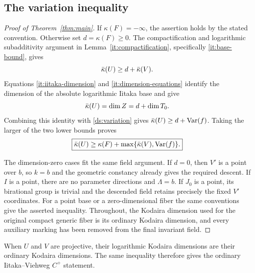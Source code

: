 \subsection{The variation inequality}

\begin{proof}[Proof of Theorem~\ref{thm:main}]
If $\kappa(F)=-\infty$,
the assertion holds by the stated convention.  Otherwise set
$d=\kappa(F)\geq0$.  The compactification and logarithmic
subadditivity argument in Lemma~\ref{it:compactification},
specifically \eqref{it:base-bound}, gives
\[
 \bar\kappa(U)\geq d+\bar\kappa(V).
\]
Equations \eqref{it:iitaka-dimension} and
\eqref{it:dimension-equations} identify the dimension of the
absolute logarithmic Iitaka base and give
\[
 \bar\kappa(U)=\dim Z=d+\dim T_0.
\]
Combining this identity with \eqref{ds:variation} gives
$\bar\kappa(U)\geq d+\operatorname{Var}(f)$.  Taking the larger of the two lower
bounds proves
\[
 \boxed{\displaystyle
 \bar\kappa(U)\geq\kappa(F)
                  +\max\{\bar\kappa(V),\operatorname{Var}(f)\}.}
\]

The dimension-zero cases fit the same field argument.  If $d=0$,
then $V'$ is a point over $b$, so $k=b$ and the geometric
constancy already gives the required descent.  If $I$ is a
point, there are no parameter directions and $\Lambda=b$.
If $J_0$ is a point, its birational group is trivial and the
descended field retains precisely the fixed $V'$ coordinates.
For a point base or a zero-dimensional fiber the same conventions
give the asserted inequality.  Throughout, the Kodaira dimension
used for the original compact generic fiber is its ordinary
Kodaira dimension, and every auxiliary marking has been removed
from the final invariant field.
\end{proof}

When $U$ and $V$ are projective, their logarithmic Kodaira dimensions
are their ordinary Kodaira dimensions.  The same inequality therefore
gives the ordinary Iitaka--Viehweg $C^+$ statement.
